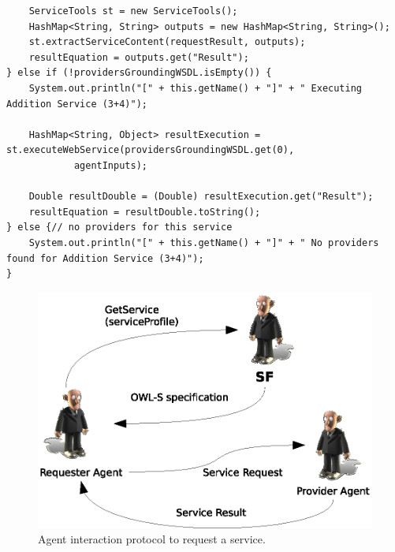 \begin{lstlisting}
	ServiceTools st = new ServiceTools();
	HashMap<String, String> outputs = new HashMap<String, String>();
	st.extractServiceContent(requestResult, outputs);
	resultEquation = outputs.get("Result");
} else if (!providersGroundingWSDL.isEmpty()) {
	System.out.println("[" + this.getName() + "]" + " Executing Addition Service (3+4)");

	HashMap<String, Object> resultExecution = st.executeWebService(providersGroundingWSDL.get(0),
			agentInputs);

	Double resultDouble = (Double) resultExecution.get("Result");
	resultEquation = resultDouble.toString();
} else {// no providers for this service
	System.out.println("[" + this.getName() + "]" + " No providers found for Addition Service (3+4)");
}

\end{lstlisting}

\begin{figure}[h!t]
	\centering
	\includegraphics[width=.8\textwidth]{Thomas/images/serviceRequest}
	\caption{Agent interaction protocol to request a service.}
\end{figure}





